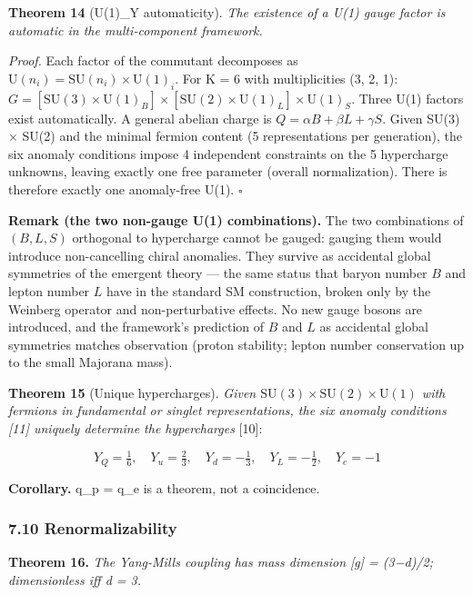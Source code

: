 \documentclass[
  11pt,
]{article}
\begin{document}
\textbf{Theorem 14} (U(1)\_Y automaticity). \emph{The existence of a
U(1) gauge factor is automatic in the multi-component framework.}

\emph{Proof.} Each factor of the commutant decomposes as
\(\mathrm{U}(n_i) = \mathrm{SU}(n_i) \times \mathrm{U}(1)_i\). For K = 6
with multiplicities (3, 2, 1):
\(G = [\mathrm{SU}(3) \times \mathrm{U}(1)_B] \times [\mathrm{SU}(2) \times \mathrm{U}(1)_L] \times \mathrm{U}(1)_S\).
Three U(1) factors exist automatically. A general abelian charge is
\(Q = \alpha B + \beta L + \gamma S\). Given SU(3) × SU(2) and the
minimal fermion content (5 representations per generation), the six
anomaly conditions impose 4 independent constraints on the 5 hypercharge
unknowns, leaving exactly one free parameter (overall normalization).
There is therefore exactly one anomaly-free U(1). \(\square\)

\textbf{Remark (the two non-gauge U(1) combinations).} The two
combinations of \((B, L, S)\) orthogonal to hypercharge cannot be
gauged: gauging them would introduce non-cancelling chiral anomalies.
They survive as accidental global symmetries of the emergent theory ---
the same status that baryon number \(B\) and lepton number \(L\) have in
the standard SM construction, broken only by the Weinberg operator and
non-perturbative effects. No new gauge bosons are introduced, and the
framework's prediction of \(B\) and \(L\) as accidental global
symmetries matches observation (proton stability; lepton number
conservation up to the small Majorana mass).

\textbf{Theorem 15} (Unique hypercharges). \emph{Given
\(\mathrm{SU}(3) \times \mathrm{SU}(2) \times \mathrm{U}(1)\) with
fermions in fundamental or singlet representations, the six anomaly
conditions {[}11{]} uniquely determine the hypercharges} {[}10{]}:

\[Y_Q = \tfrac{1}{6}, \quad Y_u = \tfrac{2}{3}, \quad Y_d = -\tfrac{1}{3}, \quad Y_L = -\tfrac{1}{2}, \quad Y_e = -1\]

\textbf{Corollary.} \textbar q\_p\textbar{} = \textbar q\_e\textbar{} is
a theorem, not a coincidence.

\hypertarget{renormalizability}{%
\subsubsection{7.10 Renormalizability}\label{renormalizability}}

\textbf{Theorem 16.} \emph{The Yang-Mills coupling has mass dimension
{[}g{]} = (3−d)/2; dimensionless iff d = 3.}
\end{document}
